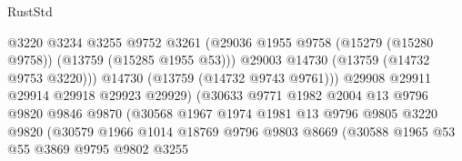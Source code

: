 \begin{lexlean}{RustStd}
\begin{coremodule}
                                          @3220
                                          @3234
                                          @3255
                                          @9752
                                          @3261
                                          (@29036
                                            @1955
                                            @9758
                                            (@15279 (@15280 @9758))
                                            (@13759 (@15285 @1955 @53)))
                                          @29003
                                          @14730
                                          (@13759 (@14732 @9753 @3220)))
                                        @14730
                                        (@13759 (@14732 @9743 @9761)))
                                      @29908
                                      @29911
                                      @29914
                                      @29918
                                      @29923
                                      @29929)
                                    (@30633
                                      @9771
                                      @1982
                                      @2004
                                      @13
                                      @9796
                                      @9820
                                      @9846
                                      @9870
                                      (@30568
                                        @1967
                                        @1974
                                        @1981
                                        @13
                                        @9796
                                        @9805
                                        @3220
                                        @9820
                                        (@30579
                                          @1966
                                          @1014
                                          @18769
                                          @9796
                                          @9803
                                          @8669
                                          (@30588
                                            @1965
                                            @53
                                            @55
                                            @3869
                                            @9795
                                            @9802
                                            @3255

\end{coremodule}
\end{lexlean}
